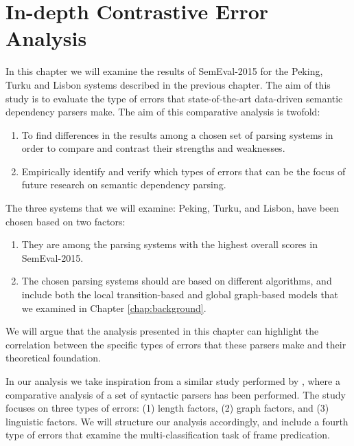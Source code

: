 \chapter{In-depth Contrastive Error Analysis}
\label{chap:analysis}




In this chapter we will examine the results of SemEval-2015 for the Peking, Turku and Lisbon systems described in the previous chapter. The aim of this study is to evaluate the type of errors that state-of-the-art data-driven semantic dependency parsers make. The aim of this comparative analysis is twofold:

\begin{enumerate}
    \item To find differences in the results among a chosen set of parsing systems in order to compare and contrast their strengths and weaknesses.
    \item Empirically identify and verify which types of errors that can be the focus of future research on semantic dependency parsing.
\end{enumerate}

The three systems that we will examine: Peking, Turku, and Lisbon, have been chosen based on two factors:

\begin{enumerate}
    \item They are among the parsing systems with the highest overall scores in SemEval-2015. 
    \item The chosen parsing systems should are based on different algorithms, and include both the local transition-based and global graph-based models that we examined in Chapter \ref{chap:background}.
\end{enumerate}

We will argue that the analysis presented in this chapter can highlight the correlation between the specific types of errors that these parsers make and their theoretical foundation.

In our analysis we take inspiration from a similar study performed by , where a comparative analysis of a set of syntactic parsers has been performed. The study focuses on three types of errors: (1) length factors, (2) graph factors, and (3) linguistic factors. We will structure our analysis accordingly, and include a fourth type of errors that examine the multi-classification task of frame predication.

